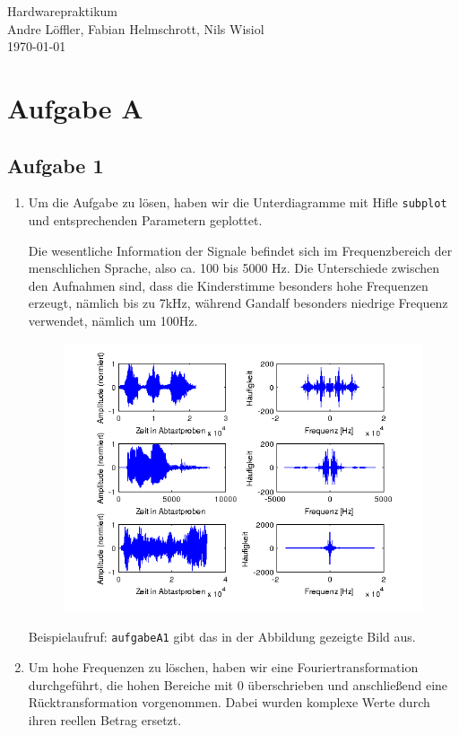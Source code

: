 \documentclass[a4paper,10pt]{scrartcl}
\begin{document}
\begin{center}
  \Huge Hardwarepraktikum \\
  \large Andre Löffler, Fabian Helmschrott, Nils Wisiol \\
  \today
\end{center}


\section*{Aufgabe A}

\subsection*{Aufgabe 1}
\begin{enumerate}
 \item Um die Aufgabe zu lösen, haben wir die Unterdiagramme mit Hifle \texttt{subplot} und entsprechenden Parametern geplottet. 

Die wesentliche Information der Signale befindet sich im Frequenzbereich der menschlichen Sprache, also ca. 100 bis 5000 Hz. Die Unterschiede zwischen den Aufnahmen sind, dass die Kinderstimme besonders hohe Frequenzen erzeugt, nämlich bis zu 7kHz, während Gandalf besonders niedrige Frequenz verwendet, nämlich um 100Hz.
\begin{figure}[h]
 \centering
 \includegraphics[width=.8\textwidth]{./Bilder/A/1_1.png}
\end{figure}

Beispielaufruf: \texttt{aufgabeA1} gibt das in der Abbildung gezeigte Bild aus.
 \item Um hohe Frequenzen zu löschen, haben wir eine Fouriertransformation durchgeführt, die hohen Bereiche mit 0 überschrieben und anschließend eine Rücktransformation vorgenommen. Dabei wurden komplexe Werte durch ihren reellen Betrag ersetzt. 


\end{enumerate}
\end{document}
